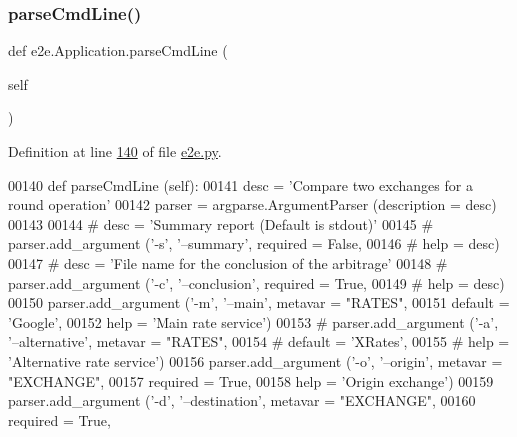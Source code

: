 \subsubsection{\texorpdfstring{parse\+Cmd\+Line()}{parseCmdLine()}}
{\footnotesize\ttfamily def e2e.\+Application.\+parse\+Cmd\+Line (\begin{DoxyParamCaption}\item[{}]{self }\end{DoxyParamCaption})}



Definition at line \hyperlink{e2e_8py_source_l00140}{140} of file \hyperlink{e2e_8py_source}{e2e.\+py}.


\begin{DoxyCode}
00140     \textcolor{keyword}{def }parseCmdLine (self):
00141         desc = \textcolor{stringliteral}{'Compare two exchanges for a round operation'}
00142         parser = argparse.ArgumentParser (description = desc)
00143         
00144 \textcolor{comment}{#        desc = 'Summary report (Default is stdout)' }
00145 \textcolor{comment}{#        parser.add\_argument ('-s', '--summary', required = False,}
00146 \textcolor{comment}{#                             help = desc)}
00147 \textcolor{comment}{#        desc = 'File name for the conclusion of the arbitrage'}
00148 \textcolor{comment}{#        parser.add\_argument ('-c', '--conclusion', required = True,}
00149 \textcolor{comment}{#                             help = desc)}
00150         parser.add\_argument (\textcolor{stringliteral}{'-m'}, \textcolor{stringliteral}{'--main'}, metavar = \textcolor{stringliteral}{"RATES"}, 
00151                              default = \textcolor{stringliteral}{'Google'},
00152                              help = \textcolor{stringliteral}{'Main rate service'})
00153 \textcolor{comment}{#        parser.add\_argument ('-a', '--alternative', metavar = "RATES",}
00154 \textcolor{comment}{#                             default = 'XRates',}
00155 \textcolor{comment}{#                             help = 'Alternative rate service')}
00156         parser.add\_argument (\textcolor{stringliteral}{'-o'}, \textcolor{stringliteral}{'--origin'}, metavar = \textcolor{stringliteral}{"EXCHANGE"},
00157                              required = \textcolor{keyword}{True},
00158                              help = \textcolor{stringliteral}{'Origin exchange'})
00159         parser.add\_argument (\textcolor{stringliteral}{'-d'}, \textcolor{stringliteral}{'--destination'}, metavar = \textcolor{stringliteral}{"EXCHANGE"},
00160                              required = \textcolor{keyword}{True},

\end{DoxyCode}
